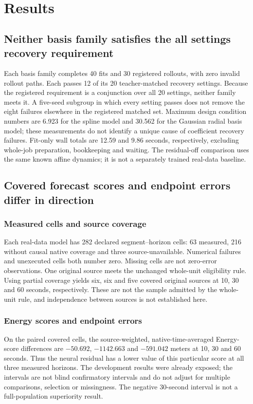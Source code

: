 \documentclass[11pt]{article}
\newcommand{\tabfile}[1]{\begin{center}\resizebox{\textwidth}{!}{}\end{center}}
\begin{document}
\section{Results}\label{sec:results}
\subsection{Neither basis family satisfies the all settings recovery requirement}\label{sec:rq1}
\tabfile{m1-recovery.tex}
Each basis family completes 40 fits and 30 registered rollouts, with zero invalid rollout paths. Each passes 12 of its 20 teacher-matched recovery settings. Because the registered requirement is a conjunction over all 20 settings, neither family meets it. A five-seed subgroup in which every setting passes does not remove the eight failures elsewhere in the registered matched set. Maximum design condition numbers are 6.923 for the spline model and 30.562 for the Gaussian radial basis model; these measurements do not identify a unique cause of coefficient recovery failures. Fit-only wall totals are 12.59 and 9.86 seconds, respectively, excluding whole-job preparation, bookkeeping and waiting. The residual-off comparison uses the same known affine dynamics; it is not a separately trained real-data baseline.

\subsection{Covered forecast scores and endpoint errors differ in direction}\label{sec:rq2}
\subsubsection{Measured cells and source coverage}
Each real-data model has 282 declared segment--horizon cells: 63 measured, 216 without causal native coverage and three source-unavailable. Numerical failures and unexecuted cells both number zero. Missing cells are not zero-error observations. One original source meets the unchanged whole-unit eligibility rule. Using partial coverage yields six, six and five covered original sources at 10, 30 and 60 seconds, respectively. These are not the sample admitted by the whole-unit rule, and independence between sources is not established here.

\subsubsection{Energy scores and endpoint errors}
\tabfile{real-energy.tex}
On the paired covered cells, the source-weighted, native-time-averaged Energy-score differences are $-50.692$, $-1142.663$ and $-591.042$ meters at 10, 30 and 60 seconds. Thus the neural residual has a lower value of this particular score at all three measured horizons. The development results were already exposed; the intervals are not blind confirmatory intervals and do not adjust for multiple comparisons, selection or missingness. The negative 30-second interval is not a full-population superiority result.
\end{document}
